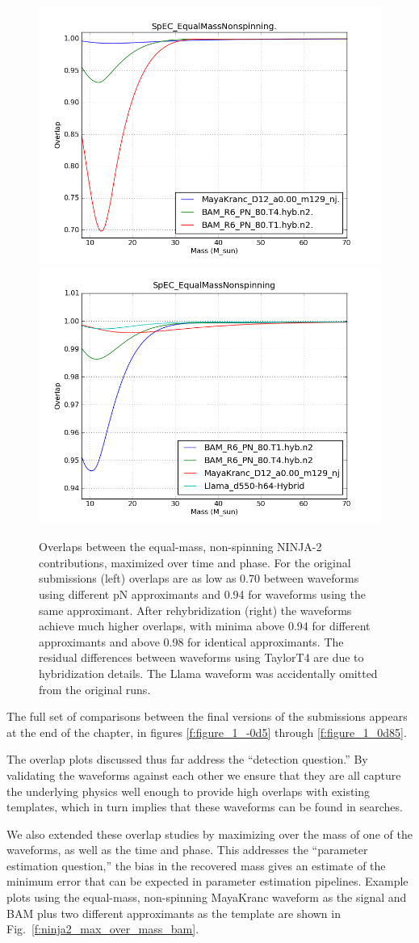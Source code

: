 \begin{figure}
  \includegraphics[width=0.5\linewidth]{figures/ninja2/q_1_z_0_figure03}
  \includegraphics[width=0.5\linewidth]{figures/ninja2/figure2_1_0_16}
  \caption[Overlaps between NINJA-2 submissions maximized over time
and phase]{
  \label{f:ninja2_overlap_test}
Overlaps between the equal-mass, non-spinning NINJA-2 contributions,
maximized over time and phase.   For the original submissions (left)
overlaps are as low as 0.70 between waveforms using different pN
approximants and 0.94 for waveforms using the same approximant.  After
rehybridization (right) the waveforms achieve much higher overlaps,
with minima above 0.94 for different approximants and above 0.98 for
identical approximants.  The residual differences between waveforms
using TaylorT4 are due to hybridization details.  The Llama waveform
was accidentally omitted from the original runs.}
\end{figure}%

The full set of comparisons between the final versions of the
submissions appears at the end of the chapter, in figures
\ref{f:figure_1_-0d5} through \ref{f:figure_1_0d85}.

The overlap plots discussed thus far address the ``detection
question.''  By validating the waveforms against each other we ensure
that they are all capture the underlying physics well enough to
provide high overlaps with existing templates, which in turn implies
that these waveforms can be found in searches.  

We also extended these overlap studies by maximizing over the mass of
one of the waveforms, as well as the time and phase.  This addresses
the ``parameter estimation question,'' the bias in the recovered mass
gives an estimate of the minimum error that can be expected in
parameter estimation pipelines.  Example plots using the equal-mass,
non-spinning MayaKranc waveform as the signal and BAM plus two
different approximants as the template are shown in
Fig.~\ref{f:ninja2_max_over_mass_bam}.


